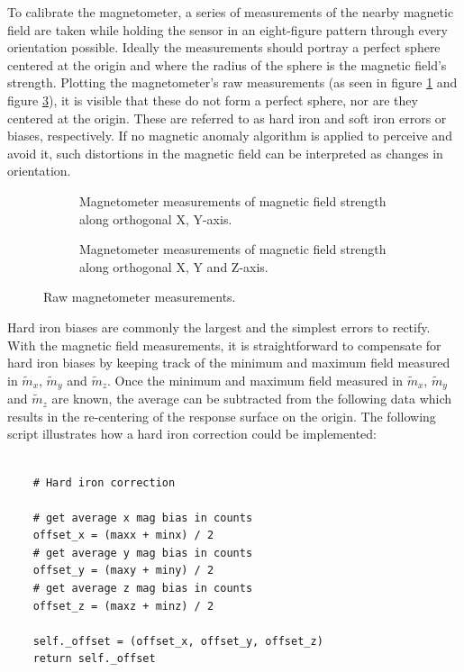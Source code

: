 To calibrate the magnetometer, a series of measurements of the nearby magnetic field are taken while holding the sensor in an eight-figure pattern through every orientation possible. Ideally the measurements should portray a perfect sphere centered at the origin and where the radius of the sphere is the magnetic field's strength. Plotting the magnetometer's raw measurements (as seen in figure \ref{plt:raw_magnetometer} and figure \ref{plt:raw_magnetometer3D}), it is visible that these do not form a perfect sphere, nor are they centered at the origin. These are referred to as hard iron and soft iron errors or biases, respectively. If no magnetic anomaly algorithm is applied to perceive and avoid it, such distortions in the magnetic field can be interpreted as changes in orientation.

\begin{figure}[!h]
    \centering
    \begin{subfigure}{0.7\textwidth}
        \centering
        \resizebox{1\linewidth}{!}{}
        \caption{Magnetometer measurements of magnetic field strength along orthogonal X, Y-axis.}
        \label{plt:raw_magnetometer}
    \end{subfigure}

    \begin{subfigure}{0.7\textwidth}
        \centering
        \resizebox{1\linewidth}{!}{}
        \caption{Magnetometer measurements of magnetic field strength along orthogonal X, Y and Z-axis.}
        \label{plt:raw_magnetometer3D}
    \end{subfigure}
    \caption{Raw magnetometer measurements.}
\end{figure}

Hard iron biases are commonly the largest and the simplest errors to rectify. With the magnetic field measurements, it is straightforward to compensate for hard iron biases by keeping track of the minimum and maximum field measured in $\widetilde{m}_x$, $\widetilde{m}_y$ and $\widetilde{m}_z$. Once the minimum and maximum field measured in $\widetilde{m}_x$, $\widetilde{m}_y$ and $\widetilde{m}_z$ are known, the average can be subtracted from the following data which results in the re-centering of the response surface on the origin. The following script illustrates how a hard iron correction could be implemented:

\lstset{language=Python}
\begin{lstlisting}[frame=single]  % Start your code-block

    # Hard iron correction

    # get average x mag bias in counts
    offset_x = (maxx + minx) / 2
    # get average y mag bias in counts
    offset_y = (maxy + miny) / 2
    # get average z mag bias in counts
    offset_z = (maxz + minz) / 2

    self._offset = (offset_x, offset_y, offset_z)
    return self._offset
\end{lstlisting}


